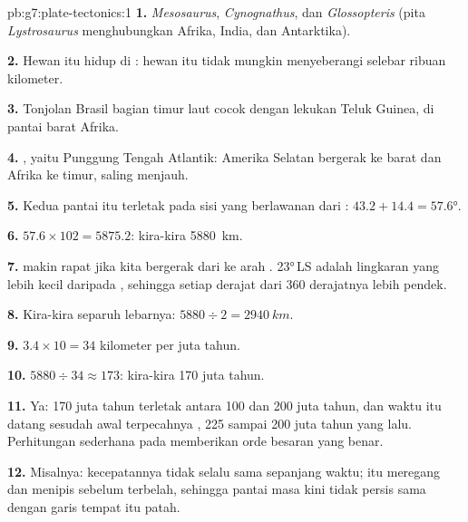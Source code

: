 \begin{solution}{pb:g7:plate-tectonics:1}
\textbf{1.} \emph{Mesosaurus}, \emph{Cynognathus}, dan \emph{Glossopteris}
(pita \emph{Lystrosaurus} menghubungkan Afrika, India, dan Antarktika).

\textbf{2.} Hewan itu hidup di : hewan itu tidak mungkin
menyeberangi   selebar ribuan kilometer.

\textbf{3.} Tonjolan Brasil bagian timur laut cocok dengan lekukan Teluk
Guinea, di pantai barat Afrika.

\textbf{4.} , yaitu Punggung Tengah Atlantik:  Amerika
Selatan bergerak ke barat dan  Afrika ke timur, saling menjauh.

\textbf{5.} Kedua pantai itu terletak pada sisi yang berlawanan dari
: $43.2 + 14.4 = \ang{57.6}$.

\textbf{6.} $57.6 \times 102 = 5875.2$: kira-kira \qty{5880}{km}.

\textbf{7.}  makin rapat jika kita bergerak dari
 ke arah .  \ang{23}\,LS adalah lingkaran yang
lebih kecil daripada , sehingga setiap derajat dari 360
derajatnya lebih pendek.

\textbf{8.} Kira-kira separuh lebarnya: $5880 \div 2 = \qty{2940}{km}$.

\textbf{9.} $3.4 \times 10 = 34$ kilometer per juta tahun.

\textbf{10.} $5880 \div 34 \approx 173$: kira-kira 170 juta tahun.

\textbf{11.} Ya: 170 juta tahun terletak antara 100 dan 200 juta tahun, dan
waktu itu datang sesudah awal terpecahnya , 225 sampai 200 juta tahun
yang lalu. Perhitungan sederhana pada  memberikan orde besaran yang
benar.

\textbf{12.} Misalnya: kecepatannya tidak selalu sama sepanjang waktu;
 itu meregang dan menipis sebelum terbelah, sehingga pantai masa
kini tidak persis sama dengan garis tempat  itu patah.
\end{solution}
